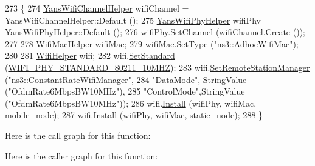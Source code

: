 \begin{DoxyCode}
273 \{
274   \hyperlink{classns3_1_1YansWifiChannelHelper}{YansWifiChannelHelper} wifiChannel = YansWifiChannelHelper::Default ();
275   \hyperlink{classns3_1_1YansWifiPhyHelper}{YansWifiPhyHelper} wifiPhy = YansWifiPhyHelper::Default ();
276   wifiPhy.\hyperlink{classns3_1_1YansWifiPhyHelper_ad2e9a27587dd4ff320435c93cc2676de}{SetChannel} (wifiChannel.\hyperlink{classns3_1_1YansWifiChannelHelper_a0532e292ab9452f3cf630c848708e563}{Create} ());
277 
278   \hyperlink{classns3_1_1WifiMacHelper}{WifiMacHelper} wifiMac;
279   wifiMac.\hyperlink{classns3_1_1WifiMacHelper_a382d8df76a1dd7007179d1963b4b6bc6}{SetType} (\textcolor{stringliteral}{"ns3::AdhocWifiMac"});
280 
281   \hyperlink{classns3_1_1WifiHelper}{WifiHelper} wifi;
282   wifi.\hyperlink{classns3_1_1WifiHelper_aa54f3e61527ef8de318d310045bc5dfd}{SetStandard} (\hyperlink{group__wifi_gga1299834f4e1c615af3ca738033b76a49aff863c98db467eb76170dc8bbe743de7}{WIFI\_PHY\_STANDARD\_80211\_10MHZ});
283   wifi.\hyperlink{classns3_1_1WifiHelper_a3d01b178aeb2de246ab5a3aa5638ce24}{SetRemoteStationManager} (\textcolor{stringliteral}{"ns3::ConstantRateWifiManager"},
284                                 \textcolor{stringliteral}{"DataMode"}, StringValue (\textcolor{stringliteral}{"OfdmRate6MbpsBW10MHz"}),
285                                 \textcolor{stringliteral}{"ControlMode"},StringValue (\textcolor{stringliteral}{"OfdmRate6MbpsBW10MHz"}));
286   wifi.\hyperlink{classns3_1_1WifiHelper_a451b3d33fa1497c22f06c5451f57a127}{Install} (wifiPhy, wifiMac, mobile\_node);
287   wifi.\hyperlink{classns3_1_1WifiHelper_a451b3d33fa1497c22f06c5451f57a127}{Install} (wifiPhy, wifiMac, static\_node);
288 \}
\end{DoxyCode}


Here is the call graph for this function\+:




Here is the caller graph for this function\+:


